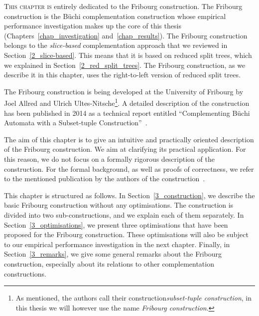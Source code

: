 \lettrine{T}{his chapter is} entirely dedicated to the Fribourg construction. The Fribourg construction is the Büchi complementation construction whose empirical performance investigation makes up the core of this thesis (Chapters~\ref{chap_investigation} and~\ref{chap_results}). The Fribourg construction belongs to the \textit{slice-based} complementation approach that we reviewed in Section~\ref{2_slice-based}. This means that it is based on reduced split trees, which we explained in Section~\ref{2_red_split_trees}. The Fribourg construction, as we describe it in this chapter, uses the right-to-left version of reduced split trees. 

The Fribourg construction is being developed at the University of Fribourg by Joel Allred and Ulrich Ultes-Nitsche\footnote{As mentioned, the authors call their construction\textit{subset-tuple construction}, in this thesis we will however use the name \textit{Fribourg construction}.}. A detailed description of the construction has been published in 2014 as a technical report entitled ``Complementing Büchi Automata with a Subset-tuple Construction''~\cite{2014_joel_ulrich}.

The aim of this chapter is to give an intuitive and practically oriented description of the Fribourg construction. We aim at clarifying its practical application. For this reason, we do not focus on a formally rigorous description of the construction. For the formal background, as well as proofs of correctness, we refer to the mentioned publication by the authors of the construction~\cite{2014_joel_ulrich}.

This chapter is structured as follows. In Section~\ref{3_construction}, we describe the basic Fribourg construction without any optimisations. The construction is divided into two sub-constructions, and we explain each of them separately. In Section~\ref{3_optimisations}, we present three optimisations that have been proposed for the Fribourg construction. These optimisations will also be subject to our empirical performance investigation in the next chapter. Finally, in Section~\ref{3_remarks}, we give some general remarks about the Fribourg construction, especially about its relations to other complementation constructions.




